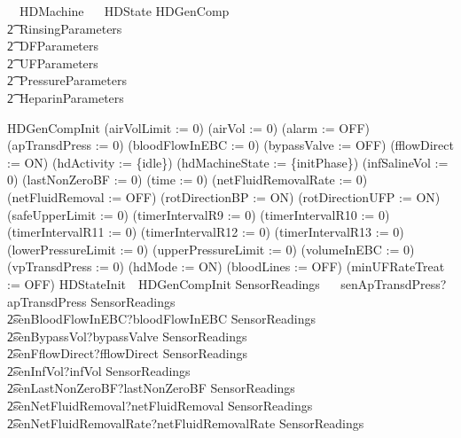 \begin{circus}%
  \circprocess\ ~HDMachine ~\circdef~ \circbegin
\circstate HDState  HDGenComp
            \\\t2\land~RinsingParameters
            \\\t2\land~DFParameters
            \\\t2\land~UFParameters
            \\\t2\land~PressureParameters
            \\\t2\land~HeparinParameters

HDGenCompInit \circdef
    (airVolLimit := 0)
    \circseq (airVol := 0)
    \circseq (alarm := OFF)
    \circseq (apTransdPress := 0)
    \circseq (bloodFlowInEBC := 0)
    \circseq (bypassValve := OFF)
    \circseq (fflowDirect := ON)
    \circseq (hdActivity := \{idle\})
    \circseq (hdMachineState := \{initPhase\})
    \circseq (infSalineVol := 0)
    \circseq (lastNonZeroBF := 0)
    \circseq (time := 0)
    \circseq (netFluidRemovalRate := 0)
    \circseq (netFluidRemoval := OFF)
    \circseq (rotDirectionBP := ON)
    \circseq (rotDirectionUFP := ON)
    \circseq (safeUpperLimit := 0)
    \circseq (timerIntervalR9 := 0)
    \circseq (timerIntervalR10 := 0)
    \circseq (timerIntervalR11 := 0)
    \circseq (timerIntervalR12 := 0)
    \circseq (timerIntervalR13 := 0)
    \circseq (lowerPressureLimit := 0)
    \circseq (upperPressureLimit := 0)
    \circseq (volumeInEBC := 0)
    \circseq (vpTransdPress := 0)
    \circseq (hdMode := ON)
    \circseq (bloodLines := OFF)
    \circseq (minUFRateTreat := OFF)
HDStateInit~\circdef~HDGenCompInit
SensorReadings ~\circdef~
    senApTransdPress?apTransdPress \then SensorReadings\\
    \t2\extchoice senBloodFlowInEBC?bloodFlowInEBC \then SensorReadings\\
    \t2\extchoice senBypassVol?bypassValve \then SensorReadings\\
    \t2\extchoice senFflowDirect?fflowDirect \then SensorReadings\\
    \t2\extchoice senInfVol?infVol \then SensorReadings\\
    \t2\extchoice senLastNonZeroBF?lastNonZeroBF \then SensorReadings\\
    \t2\extchoice senNetFluidRemoval?netFluidRemoval \then SensorReadings\\
    \t2\extchoice senNetFluidRemovalRate?netFluidRemovalRate \then SensorReadings\\

\end{circus}
